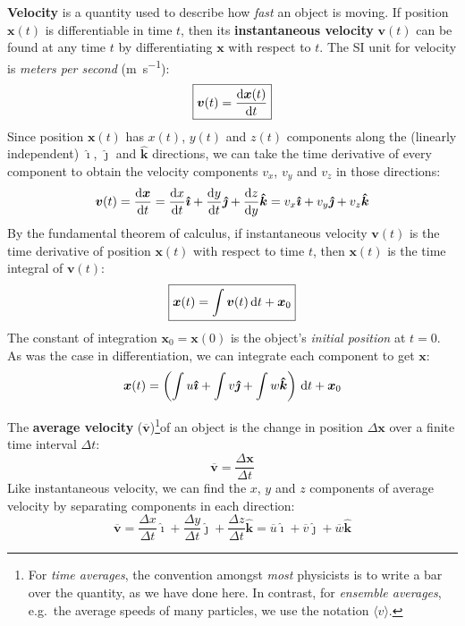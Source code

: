 \documentclass{../../../oss-handout}
\begin{document}
\textbf{Velocity} is a quantity used to describe how \emph{fast} an object is
moving. If position $\bm{x}(t)$ is differentiable in time $t$, then its
\textbf{instantaneous velocity} $\bm{v}(t)$ can be found at any time $t$ by
differentiating $\bm{x}$ with respect to $t$. The SI unit for velocity is
\emph{meters per second} (\si{\metre\per\second}):
\begin{equation}
  \boxed{\bm{v}(t)= \diff{\bm{x}(t)}t}
\end{equation}
Since position $\bm{x}(t)$ has $x(t)$, $y(t)$ and $z(t)$ components along the
(linearly independent) $\bm{\hat{\imath}}$, $\bm{\hat{\jmath}}$ and
$\bm{\hat{k}}$ directions, we can take the time derivative of every component
to obtain the velocity components $v_x$, $v_y$ and $v_z$ in those directions:
\begin{equation*}
  \bm{v}(t)= \diff{\bm{x}}t=
  \diff xt\bm{\hat{\imath}} + \diff yt\bm{\hat{\jmath}} + \diff zy\bm{\hat{k}}=
  v_x\bm{\hat{\imath}} + v_y\bm{\hat{\jmath}} + v_z\bm{\hat{k}}
\end{equation*}
By the fundamental theorem of calculus, if instantaneous velocity $\bm{v}(t)$
is the time derivative of position $\bm{x}(t)$ with respect to time $t$, then
$\bm{x}(t)$ is the time integral of $\bm{v}(t)$:
\begin{equation}
  \boxed{\bm{x}(t)=\int\bm{v}(t)\dl t + \bm{x}_0}
\end{equation}
The constant of integration $\bm{x}_0=\bm{x}(0)$ is the object's \emph{initial
  position} at $t=0$. As was the case in differentiation, we can integrate each
component to get $\bm{x}$:
\begin{equation*}
  \bm{x}(t)= \left(
  \int u\bm{\hat{\imath}} + \int v\bm{\hat{\jmath}} + \int w\bm{\hat{k}}
  \right)\dl t + \bm{x}_0
\end{equation*}


The \textbf{average velocity} ($\overline{\bm{v}}$)\footnote{For
  \emph{time averages}, the convention amongst \emph{most} physicists is to
  write a bar over the quantity, as we have done here. In contrast, for
  \emph{ensemble averages}, e.g.\ the average speeds of many particles, we use
  the notation $\langle v\rangle$. %
}of an object is the change in position $\Delta\bm{x}$ over a finite time
interval $\Delta t$:
\begin{equation}
  \boxed{\overline{\bm{v}}= \frac{\Delta\bm{x}}{\Delta t}}
\end{equation}
Like instantaneous velocity, we can find the $x$, $y$ and $z$ components of
average velocity by separating components in each direction:
\begin{equation*}
  \overline{\bm{v}}=
  \frac{\Delta x}{\Delta t}\bm{\hat{\imath}} +
  \frac{\Delta y}{\Delta t}\bm{\hat{\jmath}} +
  \frac{\Delta z}{\Delta t}\bm{\hat{k}} =
  \overline{u}\bm{\hat{\imath}} +
  \overline{v}\bm{\hat{\jmath}} +
  \overline{w}\bm{\hat{k}}
\end{equation*}
\end{document}
